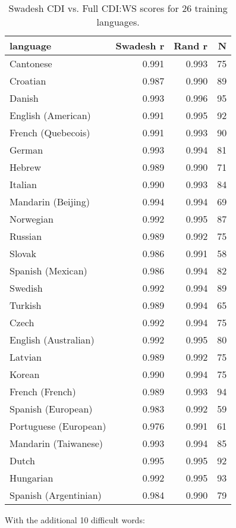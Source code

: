 \documentclass[
]{article}
\begin{document}
\begin{table}[H]
\centering
\begin{tabular}{lrrr}
  \hline
language & Swadesh r & Rand r & N \\ 
  \hline
Cantonese & 0.991 & 0.993 &   75 \\ 
  Croatian & 0.987 & 0.990 &   89 \\ 
  Danish & 0.993 & 0.996 &   95 \\ 
  English (American) & 0.991 & 0.995 &   92 \\ 
  French (Quebecois) & 0.991 & 0.993 &   90 \\ 
  German & 0.993 & 0.994 &   81 \\ 
  Hebrew & 0.989 & 0.990 &   71 \\ 
  Italian & 0.990 & 0.993 &   84 \\ 
  Mandarin (Beijing) & 0.994 & 0.994 &   69 \\ 
  Norwegian & 0.992 & 0.995 &   87 \\ 
  Russian & 0.989 & 0.992 &   75 \\ 
  Slovak & 0.986 & 0.991 &   58 \\ 
  Spanish (Mexican) & 0.986 & 0.994 &   82 \\ 
  Swedish & 0.992 & 0.994 &   89 \\ 
  Turkish & 0.989 & 0.994 &   65 \\ 
  Czech & 0.992 & 0.994 &   75 \\ 
  English (Australian) & 0.992 & 0.995 &   80 \\ 
  Latvian & 0.989 & 0.992 &   75 \\ 
  Korean & 0.990 & 0.994 &   75 \\ 
  French (French) & 0.989 & 0.993 &   94 \\ 
  Spanish (European) & 0.983 & 0.992 &   59 \\ 
  Portuguese (European) & 0.976 & 0.991 &   61 \\ 
  Mandarin (Taiwanese) & 0.993 & 0.994 &   85 \\ 
  Dutch & 0.995 & 0.995 &   92 \\ 
  Hungarian & 0.992 & 0.995 &   93 \\ 
  Spanish (Argentinian) & 0.984 & 0.990 &   79 \\ 
   \hline
\end{tabular}
\caption{Swadesh CDI vs. Full CDI:WS scores for 26 training languages.} 
\end{table}

With the additional 10 difficult words:
\end{document}
